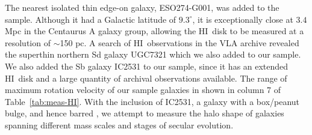 \documentclass[traditabstract]{aa} %
\newcommand\HI{H{\small I}}
\begin{document}
The nearest isolated thin edge-on galaxy, ESO274-G001, was added to
the sample. Although it had a Galactic latitude of $9.3^\circ$, it is
exceptionally close at $3.4$ Mpc in the Centaurus A galaxy group,
allowing the \HI\ disk to be measured at a resolution of $\sim$150
pc. A search of \HI\ observations
in the VLA archive revealed the superthin northern Sd galaxy UGC7321
which we also added to our sample. We also added the Sb
galaxy IC2531 to our sample, since it has an extended \HI\ disk and 
a large quantity of archival observations available. The range of
maximum rotation velocity of our sample galaxies in shown in 
column 7 of Table~\ref{tab:meas-HI}.
With the inclusion of IC2531, a galaxy with a box/peanut
bulge, and hence barred \citep{bf1999}, we
attempt to measure the halo shape of galaxies spanning
different mass scales and stages of secular evolution.
\end{document}
